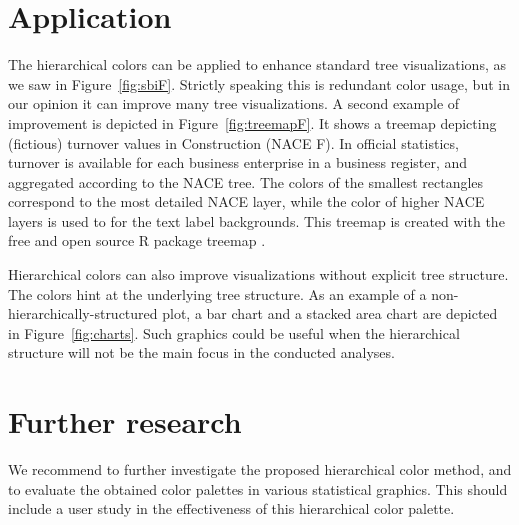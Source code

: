 \documentclass[review]{vgtc}                 %
\begin{document}
\section{Application}
The hierarchical colors can be applied to enhance standard tree visualizations, as we saw in Figure~\ref{fig:sbiF}. Strictly speaking this is redundant color usage, but in our opinion it can improve many tree visualizations. A second example of improvement is depicted in Figure~\ref{fig:treemapF}. It shows a treemap depicting (fictious) turnover values in Construction (NACE F). In official statistics, turnover is available for each business enterprise in a business register, and aggregated according to the NACE tree. The colors of the smallest rectangles correspond to the most detailed NACE layer, while the color of higher NACE layers is used to for the text label backgrounds. This treemap is created with the free and open source R package treemap \cite{treemap}.

Hierarchical colors can also improve visualizations without explicit tree structure. The colors hint at the underlying tree structure.
As an example of a non-hierarchically-structured plot, a bar chart and a stacked area chart are depicted in Figure~\ref{fig:charts}. Such graphics could be useful when the hierarchical structure will not be the main focus in the conducted analyses.

\section{Further research}

We recommend to further investigate the proposed hierarchical color method, and to evaluate the obtained color palettes in various statistical graphics. This should include a user study in the effectiveness of this hierarchical color palette.




\end{document}
